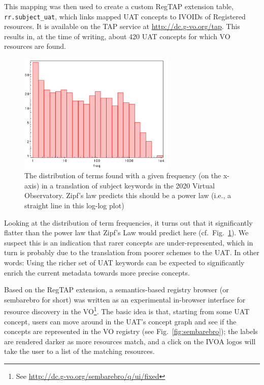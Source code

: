 \documentclass[11pt,a4paper]{ivoa}
\begin{document}
This mapping was then used to create a custom RegTAP extension table,
\verb|rr.subject_uat|, which links mapped UAT concepts to IVOIDs of
Registered resources.  It is available on the TAP service at
\url{http://dc.g-vo.org/tap}.  This results in, at the time of writing,
about 420 UAT concepts for which VO resources are found.

\begin{figure}
\includegraphics[width=7.5cm]{freqfreq.pdf}
\caption{The distribution of terms found with a given frequency (on the
x-axis) in a translation of subject keywords in the 2020 Virtual
Observatory.  Zipf's law predicts this should be a power law (i.e., a
straight line in this log-log plot)}
\label{fig:freqfreq}
\end{figure}

Looking at the distribution of term frequencies, it turns out 
that it significantly flatter than 
the power law that Zipf's Law \citep{book:manning} would predict
here (cf.~Fig.~\ref{fig:freqfreq}).  We suspect this is an indication
that rarer concepts are under-represented, which in turn is probably due
to the translation from poorer schemes to the UAT.  In other words:
Using the richer set of UAT keywords can be expected to significantly
enrich the current metadata towards more precise concepts.

Based on the RegTAP extension, a semantics-based 
registry browser (or sembarebro for
short) was written as an experimental in-browser interface for resource
discovery in the VO\footnote{See
\url{http://dc.g-vo.org/sembarebro/q/ui/fixed}}.  The basic idea is
that, starting from some UAT concept, users can move around in the
UAT's concept graph and see if the concepts are represented in the VO
registry (see Fig.~\ref{fig:sembarebro}); the labels are 
rendered darker as more
resources match, and a click on the IVOA logos will take the user to a
list of the matching resources.
\end{document}
